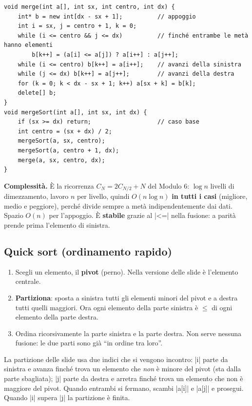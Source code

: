 \begin{lstlisting}
void merge(int a[], int sx, int centro, int dx) {
    int* b = new int[dx - sx + 1];          // appoggio
    int i = sx, j = centro + 1, k = 0;
    while (i <= centro && j <= dx)          // finché entrambe le metà hanno elementi
        b[k++] = (a[i] <= a[j]) ? a[i++] : a[j++];
    while (i <= centro) b[k++] = a[i++];    // avanzi della sinistra
    while (j <= dx) b[k++] = a[j++];        // avanzi della destra
    for (k = 0; k < dx - sx + 1; k++) a[sx + k] = b[k];
    delete[] b;
}
void mergeSort(int a[], int sx, int dx) {
    if (sx >= dx) return;                   // caso base
    int centro = (sx + dx) / 2;
    mergeSort(a, sx, centro);
    mergeSort(a, centro + 1, dx);
    merge(a, sx, centro, dx);
}
\end{lstlisting}

\textbf{Complessità.} È la ricorrenza $C_N = 2C_{N/2} + N$ del Modulo 6: $\log n$
livelli di dimezzamento, lavoro $n$ per livello, quindi $O(n \log n)$ \textbf{in
tutti i casi} (migliore, medio e peggiore), perché divide sempre a metà
indipendentemente dai dati. Spazio $O(n)$ per l'appoggio. È \textbf{stabile} grazie
al \cc|<=| nella fusione: a parità prende prima l'elemento di sinistra.

\subsection*{Quick sort (ordinamento rapido)}

\begin{passopasso}
\begin{enumerate}
  \item Scegli un elemento, il \textbf{pivot} (perno). Nella versione delle slide è
        l'elemento centrale.
  \item \textbf{Partiziona}: sposta a sinistra tutti gli elementi minori del pivot e a
        destra tutti quelli maggiori. Ora ogni elemento della parte sinistra è
        $\le$ di ogni elemento della parte destra.
  \item Ordina ricorsivamente la parte sinistra e la parte destra. Non serve nessuna
        fusione: le due parti sono già ``in ordine tra loro''.
\end{enumerate}
\end{passopasso}

La partizione delle slide usa due indici che si vengono incontro: \cc|i| parte da
sinistra e avanza finché trova un elemento che \emph{non} è minore del pivot (sta
dalla parte sbagliata); \cc|j| parte da destra e arretra finché trova un elemento che
non è maggiore del pivot. Quando entrambi si fermano, scambi \cc|a[i]| e \cc|a[j]|
e prosegui. Quando \cc|i| supera \cc|j| la partizione è finita.

